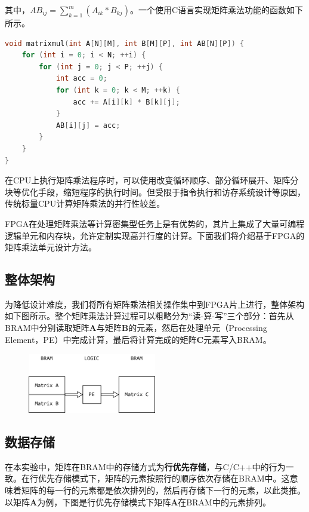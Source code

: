 \documentclass{ctexart}
\begin{document}
其中，$AB_{ij}=\sum_{k=1}^{m} (A_{ik} * B_{kj})$。一个使用C语言实现矩阵乘法功能的函数如下所示。

\begin{lstlisting}[language=C]
void matrixmul(int A[N][M], int B[M][P], int AB[N][P]) {
    for (int i = 0; i < N; ++i) {
        for (int j = 0; j < P; ++j) {
            int acc = 0;
            for (int k = 0; k < M; ++k) {
                acc += A[i][k] * B[k][j];
            }
            AB[i][j] = acc;
        }
    }
}
\end{lstlisting}

在CPU上执行矩阵乘法程序时，可以使用改变循环顺序、部分循环展开、矩阵分块等优化手段，缩短程序的执行时间。但受限于指令执行和访存系统设计等原因，传统标量CPU计算矩阵乘法的并行性较差。

FPGA在处理矩阵乘法等计算密集型任务上是有优势的，其片上集成了大量可编程逻辑单元和内存块，允许定制实现高并行度的计算。下面我们将介绍基于FPGA的矩阵乘法单元设计方法。

\subsection{整体架构}
为降低设计难度，我们将所有矩阵乘法相关操作集中到FPGA片上进行，整体架构如下图所示。整个矩阵乘法计算过程可以粗略分为“读-算-写”三个部分：首先从BRAM中分别读取矩阵$\boldsymbol{A}$与矩阵$\boldsymbol{B}$的元素，然后在处理单元（Processing Element，PE）中完成计算，最后将计算完成的矩阵$\boldsymbol{C}$元素写入BRAM。

\begin{figure}[H]
    \centering
    \includegraphics[width=0.5\textwidth]{lab4/1.png}
\end{figure}

\subsection{数据存储}
在本实验中，矩阵在BRAM中的存储方式为\textbf{行优先存储}，与C/C++中的行为一致。在行优先存储模式下，矩阵的元素按照行的顺序依次存储在BRAM中。这意味着矩阵的每一行的元素都是依次排列的，然后再存储下一行的元素，以此类推。以矩阵$\boldsymbol{A}$为例，下图是行优先存储模式下矩阵$\boldsymbol{A}$在BRAM中的元素排列。
\end{document}
